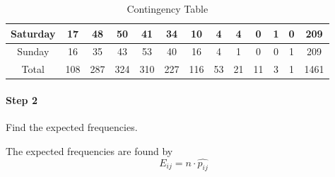 \documentclass[a4paper]{article}
\begin{document}
\begin{table}[!htbp]
\begin{tabular}{|c|c|c|c|c|c|c|c|c|c|c|c|c|}
    \hline
    \rowcolor[rgb]{ .867,  .922,  .969} Saturday & \cellcolor[rgb]{ 1,  1,  1}17 & \cellcolor[rgb]{ 1,  1,  1}48 & \cellcolor[rgb]{ 1,  1,  1}50 & \cellcolor[rgb]{ 1,  1,  1}41 & \cellcolor[rgb]{ 1,  1,  1}34 & \cellcolor[rgb]{ 1,  1,  1}10 & \cellcolor[rgb]{ 1,  1,  1}4 & \cellcolor[rgb]{ 1,  1,  1}4 & \cellcolor[rgb]{ 1,  1,  1}0 & \cellcolor[rgb]{ 1,  1,  1}1 & \cellcolor[rgb]{ 1,  1,  1}0 & 209 \\
    \hline
    \rowcolor[rgb]{ .867,  .922,  .969} Sunday & \cellcolor[rgb]{ 1,  1,  1}16 & \cellcolor[rgb]{ 1,  1,  1}35 & \cellcolor[rgb]{ 1,  1,  1}43 & \cellcolor[rgb]{ 1,  1,  1}53 & \cellcolor[rgb]{ 1,  1,  1}40 & \cellcolor[rgb]{ 1,  1,  1}16 & \cellcolor[rgb]{ 1,  1,  1}4 & \cellcolor[rgb]{ 1,  1,  1}1 & \cellcolor[rgb]{ 1,  1,  1}0 & \cellcolor[rgb]{ 1,  1,  1}0 & \cellcolor[rgb]{ 1,  1,  1}1 & 209 \\
    \hline
    \rowcolor[rgb]{ .867,  .922,  .969} Total & 108   & 287   & 324   & 310   & 227   & 116   & 53    & 21    & 11    & 3     & 1     & 1461 \\
    \hline
    \end{tabular}%
    \caption{Contingency Table}
\end{table}%

\paragraph{Step 2} Find the expected frequencies.

The expected frequencies are found by 
$$E_{ij} = n\cdot \widehat{p_{ij}}$$
\end{document}
